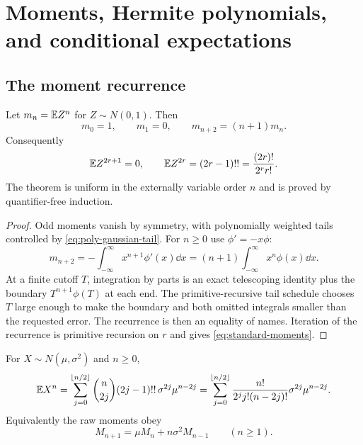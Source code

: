 \section{Moments, Hermite polynomials, and conditional expectations}\label{sec:moments}

\subsection{The moment recurrence}

\begin{theorem}\label{thm:moment-recurrence}
Let $m_n=\mathbb E Z^n$ for $Z\sim N(0,1)$.  Then
\begin{equation}\label{eq:moment-recurrence}
 m_0=1,\qquad m_1=0,\qquad m_{n+2}=(n+1)m_n.
\end{equation}
Consequently
\begin{equation}\label{eq:standard-moments}
 \mathbb E Z^{2r+1}=0,
 \qquad
 \mathbb E Z^{2r}=(2r-1)!!=\frac{(2r)!}{2^r r!}.
\end{equation}
The theorem is uniform in the externally variable order $n$ and is proved by quantifier-free induction.
\end{theorem}

\begin{proof}
Odd moments vanish by symmetry, with polynomially weighted tails controlled by \eqref{eq:poly-gaussian-tail}.  For $n\ge0$ use $\phi'=-x\phi$:
\[
 m_{n+2}=-\int_{-\infty}^{\infty}x^{n+1}\phi'(x)\dd x
 =(n+1)\int_{-\infty}^{\infty}x^n\phi(x)\dd x.
\]
At a finite cutoff $T$, integration by parts is an exact telescoping identity plus the boundary $T^{n+1}\phi(T)$ at each end.  The primitive-recursive tail schedule chooses $T$ large enough to make the boundary and both omitted integrals smaller than the requested error.  The recurrence is then an equality of names.  Iteration of the recurrence is primitive recursion on $r$ and gives \eqref{eq:standard-moments}.
\end{proof}

\begin{corollary}\label{cor:raw-moments}
For $X\sim N(\mu,\sigma^2)$ and $n\ge0$,
\begin{equation}\label{eq:raw-moment}
 \mathbb E X^n=\sum_{j=0}^{\lfloor n/2\rfloor}
  \binom{n}{2j}(2j-1)!!\,\sigma^{2j}\mu^{n-2j}
 =\sum_{j=0}^{\lfloor n/2\rfloor}
  \frac{n!}{2^j j!(n-2j)!}\sigma^{2j}\mu^{n-2j}.
\end{equation}
Equivalently the raw moments obey
\begin{equation}\label{eq:raw-rec}
 M_{n+1}=\mu M_n+n\sigma^2M_{n-1}\qquad(n\ge1).
\end{equation}
\end{corollary}

